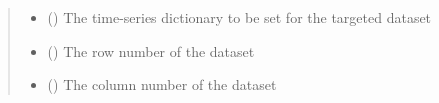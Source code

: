 \documentclass[letterpaper,10pt,english]{sphinxmanual}
\begin{document}
\begin{fulllineitems}
\begin{fulllineitems}
\begin{quote}
\begin{description}
\begin{itemize}
\item {} 
 () \textendash{} The time-series dictionary to be set for the targeted dataset

\item {} 
 () \textendash{} The row number of the dataset

\item {} 
 () \textendash{} The column number of the dataset

\end{itemize}

\end{description}\end{quote}

\end{fulllineitems}


\end{fulllineitems}
\end{document}
